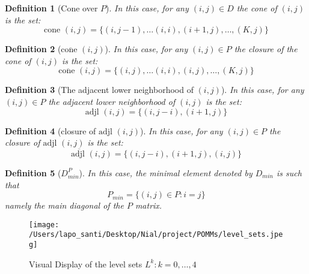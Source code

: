 \documentclass[11pt]{amsart}
\newtheorem{definition}{Definition}
\begin{document}
\begin{definition}[Cone over $P$]In this case, for any $(i,j) \in D$ the cone of $(i,j)$ is the set:
\begin{equation}
\text{cone } (i,j)  = \{(i,j-1), \ldots (i,i), (i+1,j), \dots,(K,j) \}
\end{equation}
\end{definition}
\begin{definition}[$\overline{\text{cone }} (i,j)$]
In this case, for any $(i,j) \in P$ the closure of the cone of $(i,j)$ is the set:
\begin{equation}
\overline{\text{cone }} (i,j)  = \{(i,j), \ldots (i,i), (i,j), \dots,(K,j) \}
\end{equation}
\end{definition}

\begin{definition}[The adjacent lower neighborhood of $(i,j)$]
In this case, for any $(i,j) \in P$ the adjacent lower neighborhood of $(i,j)$ is the set:
\begin{equation}
\text{adjl } (i,j)  = \{(i,j-i), (i+1,j)\}
\end{equation}
\end{definition}

\begin{definition}[closure of $\text{adjl } (i,j)$]
In this case, for any $(i,j) \in P$ the closure of $\text{adjl } (i,j)$ is the set:
\begin{equation}
\overline{\text{adjl }} (i,j)  = \{(i,j-i), (i+1,j), (i,j)\}
\end{equation}
\end{definition}

\begin{definition}[$D_{min}^P$]
In this case, the \textit{minimal element} denoted by $D_{min}$ is such that
\begin{equation}
P_{min}  = \{(i,j) \in P: i=j\}
\end{equation}
namely the main diagonal of the $P$ matrix. 
\end{definition}
\begin{figure}
\begin{center}
\texttt{[image: /Users/lapo\_santi/Desktop/Nial/project/POMMs/level\_sets.jpeg]}
\caption{Visual Display of the level sets $L^k: k=0,\ldots,4$}
\label{fig:level_sets}
\end{center}
\end{figure}
\end{document}
